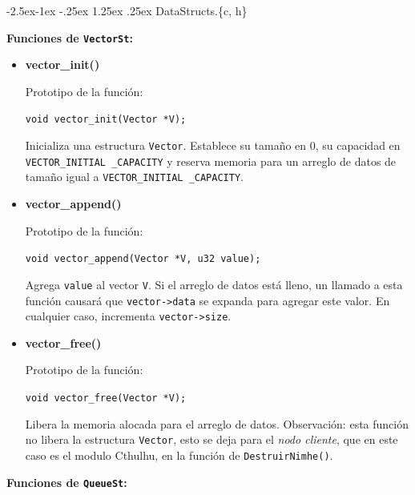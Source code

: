 \documentclass[11pt,a4paper]{article}
\makeatletter
\renewcommand\paragraph{\@startsection{paragraph}{4}{\z@}%
            {-2.5ex\@plus -1ex \@minus -.25ex}%
            {1.25ex \@plus .25ex}%
            {\normalfont\normalsize\bfseries}}
\theoremstyle{plain}
\makeatother
\begin{document}
				\paragraph{DataStructs.\{c, h\}}

\textbf{Funciones de \texttt{VectorSt}:}

\begin{itemize}
\item{\textbf{{vector\_init()}}}

Prototipo de la función:

\texttt{void vector\_init(Vector *V);}

Inicializa una estructura \texttt{Vector}. Establece su tamaño en 0, su capacidad en \texttt{VECTOR\_INITIAL \_CAPACITY} y reserva memoria para un arreglo de datos de tamaño igual a \texttt{VECTOR\_INITIAL \_CAPACITY}.

\item{\textbf{{vector\_append()}}}

Prototipo de la función:

\texttt{void vector\_append(Vector *V, u32 value);}

Agrega \texttt{value} al vector \texttt{V}. Si el arreglo de datos está lleno, un llamado a esta función causará que \texttt{vector->data} se expanda para agregar este valor. En cualquier caso, incrementa \texttt{vector->size}.

\item{\textbf{{vector\_free()}}}

Prototipo de la función:

\texttt{void vector\_free(Vector *V);}

Libera la memoria alocada para el arreglo de datos. Observación: esta función no libera la estructura \texttt{Vector}, esto se deja para el \emph{nodo cliente}, que en este caso es el modulo Cthulhu, en la función de \texttt{DestruirNimhe()}.

\end{itemize}

\textbf{Funciones de \texttt{QueueSt}:}
\end{document}

